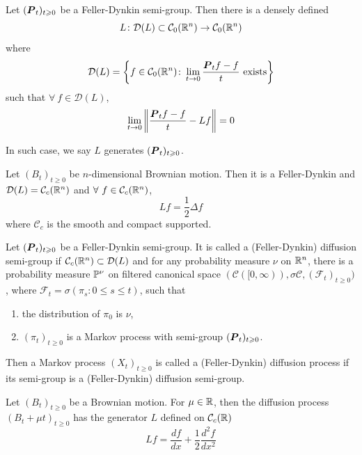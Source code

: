 \documentclass[a4paper,12pt]{article}
\begin{document}
\begin{itemize}
  \begin{prop}
    Let $(\boldsymbol{P}_t)_{t\geqslant 0}$ be a Feller-Dynkin semi-group. Then there is a densely defined
    \begin{equation*}
      L \colon \mathcal{D}(L) \subset \mathcal{C}_0(\mathbb{R}^n) \rightarrow \mathcal{C}_0(\mathbb{R}^n)
    \end{equation*}
    where
    \begin{equation*}
      \mathcal{D}(L) = \left\{f \in \mathcal{C}_0(\mathbb{R}^n) \colon \lim_{t \rightarrow 0} \frac{\boldsymbol{P}_tf - f}{t} \text{ exists}\right\}
    \end{equation*}
    such that $\forall~f \in \mathcal{D}(L)$,
    \begin{equation*}
      \lim_{t \rightarrow 0} \left\lVert \frac{\boldsymbol{P}_tf - f}{t} - Lf\right\lVert = 0
    \end{equation*}
  \end{prop}
  In such case, we say $L$ generates $(\boldsymbol{P}_t)_{t\geqslant 0}$.

  \begin{exam}
    Let $(B_t)_{t \geqslant 0}$ be $n$-dimensional Brownian motion. Then it is a Feller-Dynkin and $\mathcal{D}(L) = \mathcal{C}_c(\mathbb{R}^n)$ and $\forall~f \in \mathcal{C}_c(\mathbb{R}^n)$,
    \begin{equation*}
      Lf = \frac{1}{2}\Delta f
    \end{equation*}
    where $\mathcal{C}_c$ is the smooth and compact supported.
  \end{exam}

  \noindent Let $(\boldsymbol{P}_t)_{t\geqslant 0}$ be a Feller-Dynkin semi-group. It is called a (Feller-Dynkin) diffusion semi-group if $\mathcal{C}_c(\mathbb{R}^n) \subset \mathcal{D}(L)$ and for any probability measure $\nu$ on $\mathbb{R}^n$, there is a probability measure $\mathbb{P}^{\nu}$ on filtered canonical space $(\mathcal{C}([0,\infty)),\sigma{\mathcal{C}},(\mathcal{F}_t)_{t \geqslant 0})$, where $\mathcal{F}_t =\sigma(\pi_s\colon 0\leqslant s \leqslant t)$, such that
  \begin{enumerate}[label=(\arabic*)]
    \item the distribution of $\pi_0$ is $\nu$,
    \item $(\pi_t)_{t \geqslant 0}$ is a Markov process with semi-group $(\boldsymbol{P}_t)_{t\geqslant 0}$.
  \end{enumerate}
  Then a Markov process $(X_t)_{t\geqslant 0}$ is called a (Feller-Dynkin) diffusion process if its semi-group is a (Feller-Dynkin) diffusion semi-group.

  \begin{exam}
    Let $(B_t)_{t \geqslant 0}$ be a Brownian motion. For $\mu \in \mathbb{R}$, then the diffusion process $(B_t + \mu t)_{t \geqslant 0}$ has the generator $L$ defined on $\mathcal{C}_c(\mathbb{R})$
    \begin{equation*}
      Lf = \frac{df}{dx} + \frac{1}{2}\frac{d^2f}{dx^2}
    \end{equation*}
  \end{exam}


\end{itemize}
\end{document}

